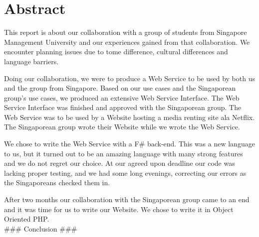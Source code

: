 \section*{Abstract}
This report is about our collaboration with a group of students from Singapore Management University and our experiences gained from that collaboration. We encounter planning issues due to tome difference, cultural differences and language barriers.

Doing our collaboration, we were to produce a Web Service to be used by both us and the group from Singapore. Based on our use cases and the Singaporean group's use cases, we produced an extensive Web Service Interface. The Web Service Interface was finished and approved with the Singaporean group.
The Web Service was to be used by a Website hosting a media renting site ala Netflix. The Singaporean group wrote their Website while we wrote the Web Service.

We chose to write the Web Service with a F\# back-end. This was a new language to us, but it turned out to be an amazing language with many strong features and we do not regret our choice.
At our agreed upon deadline our code was lacking proper testing, and we had some long evenings, correcting our errors as the Singaporeans checked them in.

After two months our collaboration with the Singaporean group came to an end and it was time for us to write our Website. We chose to write it in Object Oriented PHP.
\newline
\\
\#\#\# Conclusion \#\#\# 
\newpage